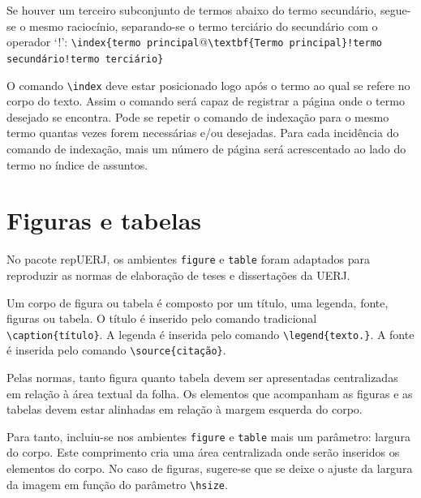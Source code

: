 \documentclass[a4paper,12pt,oneside,onecolumn,final,fleqn]{repUERJ}
\begin{document}
Se houver um terceiro subconjunto de termos abaixo do termo secundário, segue-se o mesmo raciocínio, separando-se o termo terciário do secundário com o operador `!': \texttt{\textbackslash index\{termo principal$@$\textbackslash textbf\{Termo principal\}!termo secundário!termo terciário\}}

O comando \texttt{\textbackslash index} deve estar posicionado logo após o termo ao qual se refere no corpo do texto. Assim o comando será capaz de registrar a página onde o termo desejado se encontra. Pode se repetir o comando de indexação para o mesmo termo quantas vezes forem necessárias e/ou desejadas. Para cada incidência do comando de indexação, mais um número de página será acrescentado ao lado do termo no índice de assuntos.

\chapter{Figuras e tabelas}

No pacote \textsf{repUERJ}, os ambientes \texttt{figure} e \texttt{table} foram adaptados para reproduzir as normas de elaboração de teses e dissertações da UERJ.

Um corpo de figura ou tabela é composto por um título, uma legenda, fonte, figuras ou tabela. O título é inserido pelo comando tradicional \texttt{\textbackslash caption\{título\}}. A legenda é inserida pelo comando \texttt{\textbackslash legend\{texto.\}}. A fonte é inserida pelo comando \texttt{\textbackslash source\{citação\}}.

Pelas normas, tanto figura quanto tabela devem ser apresentadas centralizadas em relação à área textual da folha. Os elementos que acompanham as figuras e as tabelas devem estar alinhadas em relação à margem esquerda do corpo. 

Para tanto, incluiu-se nos ambientes \texttt{figure} e \texttt{table} mais um parâmetro: largura do corpo. Este comprimento cria uma área centralizada onde serão inseridos os elementos do corpo. No caso de figuras, sugere-se que se deixe o ajuste da largura da imagem em função do parâmetro \texttt{\textbackslash hsize}.
\end{document}
